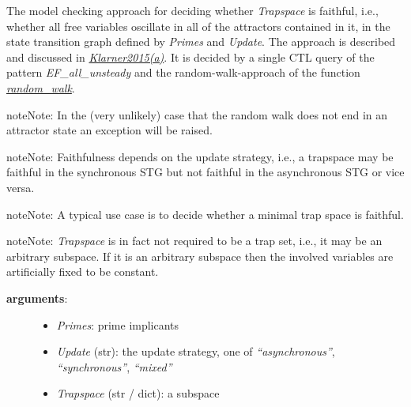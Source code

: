 \documentclass[letterpaper,10pt,english]{sphinxmanual}
\begin{document}
\begin{fulllineitems}
\label{AttractorDetection:PyBoolNet.AttractorDetection.faithfulness}
The model checking approach for deciding whether \emph{Trapspace} is faithful,
i.e., whether all free variables oscillate in all of the attractors contained in it,
in the state transition graph defined by \emph{Primes} and \emph{Update}.
The approach is described and discussed in {\hyperref[Bibliography:klarner2015trap]{\emph{Klarner2015(a)}}}.
It is decided by a single CTL query of the pattern \emph{EF\_all\_unsteady}
and the random-walk-approach of the function {\hyperref[StateTransitionGraphs:random-walk]{\emph{random\_walk}}}.

\begin{notice}{note}{Note:}
In the (very unlikely) case that the random walk does not end in an attractor state an exception will be raised.
\end{notice}

\begin{notice}{note}{Note:}
Faithfulness depends on the update strategy, i.e.,
a trapspace may be faithful in the synchronous STG but not faithful in the asynchronous STG or vice versa.
\end{notice}

\begin{notice}{note}{Note:}
A typical use case is to decide whether a minimal trap space is faithful.
\end{notice}

\begin{notice}{note}{Note:}
\emph{Trapspace} is in fact not required to be a trap set, i.e., it may be an arbitrary subspace.
If it is an arbitrary subspace then the involved variables are artificially fixed to be constant.
\end{notice}
\begin{description}
\item[{\textbf{arguments}:}] \leavevmode\begin{itemize}
\item {} 
\emph{Primes}: prime implicants

\item {} 
\emph{Update} (str): the update strategy, one of \emph{``asynchronous''}, \emph{``synchronous''}, \emph{``mixed''}

\item {} 
\emph{Trapspace} (str / dict): a subspace


\end{itemize}
\end{description}
\end{fulllineitems}
\end{document}
